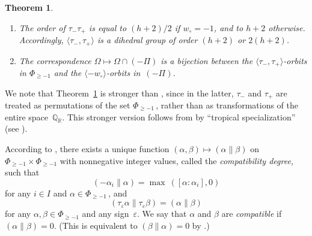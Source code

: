 \documentclass[letterpaper]{amsart}
\numberwithin{equation}{section}
\newtheorem{theorem}{Theorem}[section]
\theoremstyle{definition}
\def\RR{\mathbb{R}}
\def\QQ{\mathbb{Q}}
\begin{document}
 
\begin{theorem} 
\label{th:dihedral} 
{\rm \cite[Theorems~1.2,~2.6]{yga}} 
{\ } 
\begin{enumerate} 
\item 
The order of $\tau_-  \tau_+$ is 
equal to $(h+2)/2$ if $w_\circ = -1$, and to $h+2$ otherwise. 
Accordingly, $\langle\tau_-,\tau_+\rangle$ 
is a dihedral group of order 
$(h+2)$ or $2(h+2)$. 
\item 
The correspondence $\Omega \mapsto \Omega \cap (- \Pi)$ 
is a bijection between the $\langle\tau_-,\tau_+\rangle$-orbits in  $\Phi_{\geq - 1}$ 
and the $\langle - w_\circ \rangle$-orbits 
in~$(- \Pi)$. 
\end{enumerate} 
\end{theorem} 
 
We note that Theorem~\ref{th:dihedral} is stronger than 
\cite[Theorem~2.6]{yga}, since in the latter, $\tau_-$ 
and $\tau_+$ are treated as permutations of the set $\Phi_{\geq - 
  1}\,$, rather than as transformations of the entire 
space~$\QQ_\RR$. 
This stronger version follows from \cite[Theorem~1.2]{yga} by 
``tropical specialization'' (see \cite[(1.8)]{yga}). 
 
 
 
According to \cite[Section~3.1]{yga}, there exists a unique function 
$(\alpha,\beta)\mapsto (\alpha \| \beta)$ on $\Phi_{\geq 
  -1}\times\Phi_{\geq -1}$ with nonnegative integer values, 
called the \emph{compatibility degree,} 
such that 
\begin{equation} 
\label{eq:compatibility-1} 
(- \alpha_i \| \alpha) 
= \max \ ([\alpha : \alpha_i], 0) 
\end{equation} 
for any $i \in I$ and $\alpha \in\Phi_{\geq -1}\,$, 
and 
\begin{equation} 
\label{eq:compatibility-2} 
(\tau_\varepsilon \alpha \| \tau_\varepsilon \beta) = (\alpha \| 
\beta) 
\end{equation} 
for any $\alpha, \beta \in \Phi_{\geq -1}$ 
and any sign~$\varepsilon$. 
We say that 
$\alpha$ and $\beta$ are 
\emph{compatible} if 
$(\alpha \| \beta)=0$. 
(This is equivalent to $(\beta \| \alpha) = 0$ by 
\cite[Proposition~3.3, Part~2]{yga}.) 
 
\end{document}
